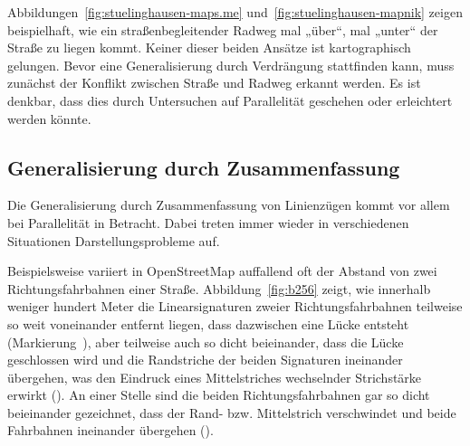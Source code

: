 \documentclass[../main/thesis.tex]{subfiles}
\begin{document}
Abbildungen~\ref{fig:stuelinghausen-maps.me} und~\ref{fig:stuelinghausen-mapnik} zeigen beispielhaft, wie ein straßenbegleitender Radweg mal „über“, mal „unter“ der Straße zu liegen kommt.
Keiner dieser beiden Ansätze ist kartographisch gelungen.
Bevor eine Generalisierung durch Verdrängung stattfinden kann, muss zunächst der Konflikt zwischen Straße und Radweg erkannt werden.
Es ist denkbar, dass dies durch Untersuchen auf Parallelität geschehen oder erleichtert werden könnte.



\subsection{Generalisierung durch Zusammenfassung}

Die Generalisierung durch Zusammenfassung von Linienzügen kommt vor allem bei Parallelität in Betracht.
Dabei treten immer wieder in verschiedenen Situationen Darstellungsprobleme auf.

\label{dual-highway-case-2}

Beispielsweise variiert in OpenStreetMap auffallend oft der Abstand von zwei Richtungsfahrbahnen einer Straße.
Abbildung~\ref{fig:b256} zeigt, wie innerhalb weniger hundert Meter die Linearsignaturen zweier Richtungsfahrbahnen teilweise so weit voneinander entfernt liegen, dass dazwischen eine Lücke entsteht (Markierung~), aber teilweise auch so dicht beieinander, dass die Lücke geschlossen wird und die Randstriche der beiden Signaturen ineinander übergehen, was den Eindruck eines Mittelstriches wechselnder Strichstärke erwirkt ().
An einer Stelle sind die beiden Richtungsfahrbahnen gar so dicht beieinander gezeichnet, dass der Rand- bzw. Mittelstrich verschwindet und beide Fahrbahnen ineinander übergehen ().

\end{document}
